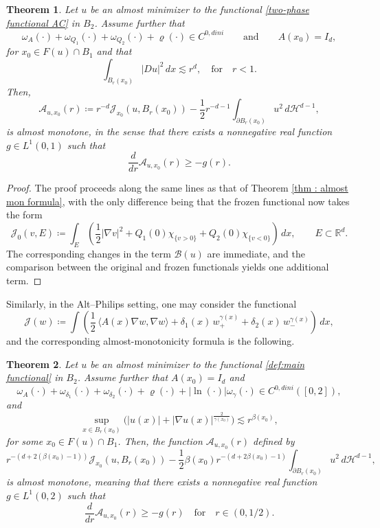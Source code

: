 \documentclass[reqno,11pt]{amsart}
\newtheorem{theorem}{Theorem}[section]
\newcommand{\1}{\mathds{1}}  %
\numberwithin{equation}{section}
\begin{document}
\begin{theorem}\label{thm : almost mon formula 2}
Let $u$ be an almost minimizer to the functional \eqref{two-phase functional AC} in $B_2$. Assume further that
\[
	\omega_A(\cdot) + \omega_{Q_1}(\cdot) + \omega_{Q_2}(\cdot) + \varrho(\cdot) \in C^{0,dini} \qquad \text{and} \qquad A(x_0) = I_d,
\]
for $x_0 \in F(u)\cap B_1$ and that
\[
	\int_{B_r(x_0)} |Du|^2\,dx \lesssim r^d, \quad \text{for} \quad r<1.
\]
Then,
\[
    \mathcal{A}_{u,x_0}(r) \coloneqq r^{-d}\mathcal{J}_{x_0}(u,B_r(x_0)) - \frac{1}{2}r^{-d - 1}\int_{\partial B_r(x_0)}u^2\, d\mathcal{H}^{d-1},
\]
is almost monotone, in the sense that there exists a nonnegative real function $g \in L^1(0,1)$ such that
\[
	\frac{d}{dr} \mathcal{A}_{u,x_0}(r) \geq -g(r).
\]
\end{theorem}

\begin{proof}
The proof proceeds along the same lines as that of Theorem \ref{thm : almost mon formula}, with the only difference being that the frozen functional now takes the form
\[
\mathcal J_{0}(v,E)\coloneqq \int_{E}\left(\frac12|\nabla v|^2+Q_1(0)\chi_{\{v>0\}} +Q_2(0)\chi_{\{v<0\}} \right)\,dx, \qquad E\subset \mathbb R^d.
\]
The corresponding changes in the term $\mathcal{B}(u)$ are immediate, and the comparison between the original and frozen functionals yields one additional term.
\end{proof}

Similarly, in the Alt--Philips setting, one may consider the functional
\begin{equation}\label{two-phase functional AP}
    \mathcal{J}(w) \coloneqq \int \left( \frac{1}{2} \, \langle A(x)\nabla w, \nabla w \rangle + \delta_1(x)\,w_+^{\gamma(x)} + \delta_2(x)\,w_-^{\gamma(x)} \right)\,dx,
\end{equation}
and the corresponding almost-monotonicity formula is the following.

\begin{theorem}\label{thm:almost-monotonicity-3}
Let $u$ be an almost minimizer to the functional \eqref{def:main functional} in $B_2$. Assume further that $A(x_0) = I_d$ and
\[
	\omega_A(\cdot) + \omega_{\delta_1}(\cdot) + \omega_{\delta_2}(\cdot) + \varrho(\cdot) + |\ln(\cdot)|\omega_{\gamma}(\cdot) \in C^{0,dini} ([0,2]),
\]
and
\[
    \sup_{x\in B_r(x_0)}\Big(|u(x)|+|\nabla u(x)|^{\frac{2}{\gamma(x_0)}}\Big) \lesssim r^{\beta(x_0)},
\]
for some $x_0 \in F(u)\cap B_1$. Then, the function $\mathcal{A}_{u,x_0}(r)$ defined by
\[
     r^{-(d + 2(\beta(x_0) - 1))}\mathcal{J}_{x_0}(u,B_r(x_0)) - \frac{1}{2}\beta(x_0)r^{-(d + 2\beta(x_0) -1)}\int_{\partial B_r(x_0)}u^2\, d\mathcal{H}^{d-1},
\]
is almost monotone, meaning that there exists a nonnegative real function $g \in L^1(0,2)$ such that
\[
	\frac{d}{dr} \mathcal{A}_{u,x_0}(r) \geq -g(r) \quad \text{for} \quad r \in (0,1/2).
\]
\end{theorem}
\end{document}
